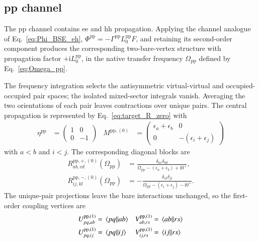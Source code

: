 \documentclass[aip,jcp,reprint,noshowkeys,superscriptaddress]{revtex4-1}
\newcommand{\eps}{\epsilon}
\newcommand{\ii}{\mathrm{i}}
\newcommand{\ee}{\text{ee}}
\newcommand{\pp}{\text{pp}}
\newcommand{\hh}{\text{hh}}
\begin{document}
\subsection{pp channel}

The $\pp$ channel contains $\ee$ and $\hh$ propagation.
Applying the channel analogue of Eq.~\eqref{eq:Phi_BSE_eh},
$\Phi^\pp=-\Gamma^\pp L_0^\pp F$, and retaining its second-order component
produces the corresponding two-bare-vertex structure with propagation
factor $+\ii L_0^\pp$, in the native transfer
frequency $\Omega_\pp$ defined by Eq.~\eqref{eq:Omega_pp}.

The frequency integration selects the antisymmetric virtual-virtual and
occupied-occupied pair spaces; the isolated mixed-sector integrals vanish.
Averaging the two orientations of each pair leaves contractions over
unique pairs. The central propagation is represented by
Eq.~\eqref{eq:target_R_zero} with
\begin{align}
	\eta^\pp
	&=
	\begin{pmatrix}
	1&0
	\\
	0&-1
	\end{pmatrix}
	&
	M^{\pp,(0)}
	&=
	\begin{pmatrix}
	\eps_a+\eps_b&0
	\\
	0&-(\eps_i+\eps_j)
	\end{pmatrix}
	\label{eq:eta_M_pp_zero}
\end{align}
with $a<b$ and $i<j$.
The corresponding diagonal blocks are
\begin{align}
    R^{\pp,+,(0)}_{ab,cd}(\Omega_\pp)
    &=\frac{\delta_{ac}\delta_{bd}}
    {\Omega_\pp-(\eps_a+\eps_b)+\ii0^+},
    \\
    R^{\pp,-,(0)}_{ij,kl}(\Omega_\pp)
    &=-\frac{\delta_{ik}\delta_{jl}}
    {\Omega_\pp-(\eps_i+\eps_j)-\ii0^+}.
    \label{eq:R_pp_zero}
\end{align}
The unique-pair projections leave the bare interactions unchanged,
so the first-order coupling vertices are
\begin{align}
	U^{\pp,(1)}_{pq,ab}
	&=
	\mel{pq}{}{ab}
	&
	V^{\pp,(1)}_{ab,rs}
	&=
	\mel{ab}{}{rs}
	\label{eq:UV_pp_first_ee}
	\\
	U^{\pp,(1)}_{pq,ij}
	&=
	\mel{pq}{}{ij}
	&
	V^{\pp,(1)}_{ij,rs}
	&=
	\mel{ij}{}{rs}
	\label{eq:UV_pp_first_hh}
\end{align}
\end{document}
